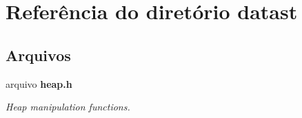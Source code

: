 \section{Referência do diretório datast}
\label{dir_f14de42a71a14f2d520d5e47ce140531}
\subsection*{Arquivos}
\begin{DoxyCompactItemize}
\item 
arquivo {\bf heap.\+h}
\begin{DoxyCompactList}\small\item\em Heap manipulation functions. \end{DoxyCompactList}\end{DoxyCompactItemize}
